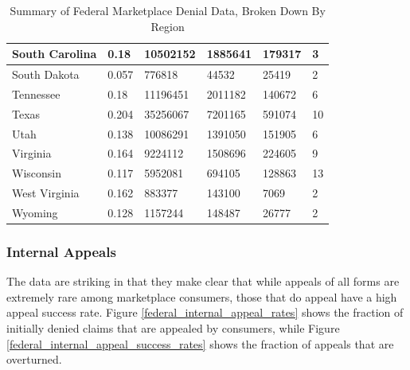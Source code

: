 \documentclass[psamsfonts]{amsart}
\theoremstyle{plain}
\theoremstyle{definition}
\theoremstyle{remark}
\begin{document}
\begin{table}[!ht]
\begin{tabular}{|p{3cm}|p{2cm}|p{2cm}|p{2cm}|p{3cm}|p{2cm}|}
		South Carolina & 0.18 & 10502152 & 1885641 & 179317 & 3 \\ \hline
		South Dakota & 0.057 & 776818 & 44532 & 25419 & 2 \\ \hline
		Tennessee & 0.18 & 11196451 & 2011182 & 140672 & 6 \\ \hline
		Texas & 0.204 & 35256067 & 7201165 & 591074 & 10 \\ \hline
		Utah & 0.138 & 10086291 & 1391050 & 151905 & 6 \\ \hline
		Virginia & 0.164 & 9224112 & 1508696 & 224605 & 9 \\ \hline
		Wisconsin & 0.117 & 5952081 & 694105 & 128863 & 13 \\ \hline
		West Virginia & 0.162 & 883377 & 143100 & 7069 & 2 \\ \hline
		Wyoming & 0.128 & 1157244 & 148487 & 26777 & 2 \\ \hline
	\end{tabular}
\caption{Summary of Federal Marketplace Denial Data, Broken Down By Region}
	\label{federal_denial_data_by_region_table}
\end{table}

\subsubsection{Internal Appeals}

The data are striking in that they make clear that while appeals of all forms are extremely rare among marketplace consumers, those that do appeal have a high appeal success rate. Figure \ref{federal_internal_appeal_rates} shows the fraction of initially denied claims that are appealed by consumers, while Figure \ref{federal_internal_appeal_success_rates} shows the fraction of appeals
that are overturned.\\
\end{document}
